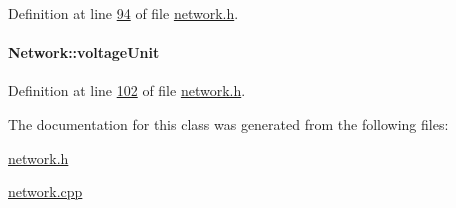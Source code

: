 Definition at line \hyperlink{network_8h_source_l00094}{94} of file \hyperlink{network_8h_source}{network.\+h}.

\hypertarget{class_network_acde031ef95f5c05565ee35769f2ed89e}{}
\paragraph[{voltage\+Unit}]{ Network\+::voltage\+Unit\hspace{0.3cm}{\ttfamily [static]}}\label{class_network_acde031ef95f5c05565ee35769f2ed89e}


Definition at line \hyperlink{network_8h_source_l00102}{102} of file \hyperlink{network_8h_source}{network.\+h}.



The documentation for this class was generated from the following files\+:\begin{DoxyCompactItemize}
\item 
\hyperlink{network_8h}{network.\+h}\item 
\hyperlink{network_8cpp}{network.\+cpp}\end{DoxyCompactItemize}
